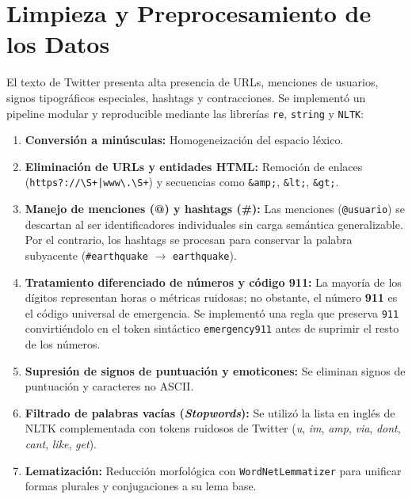 \documentclass[11pt,a4paper]{article}
\begin{document}
\section{Limpieza y Preprocesamiento de los Datos}
El texto de Twitter presenta alta presencia de URLs, menciones de usuarios, signos tipográficos especiales, hashtags y contracciones. Se implementó un pipeline modular y reproducible mediante las librerías \texttt{re}, \texttt{string} y \texttt{NLTK}:

\begin{enumerate}
    \item \textbf{Conversión a minúsculas:} Homogeneización del espacio léxico.
    \item \textbf{Eliminación de URLs y entidades HTML:} Remoción de enlaces (\texttt{https?://\textbackslash S+|www\textbackslash .\textbackslash S+}) y secuencias como \texttt{\&amp;}, \texttt{\&lt;}, \texttt{\&gt;}.
    \item \textbf{Manejo de menciones (@) y hashtags (\#):} Las menciones (\texttt{@usuario}) se descartan al ser identificadores individuales sin carga semántica generalizable. Por el contrario, los hashtags se procesan para conservar la palabra subyacente (\texttt{\#earthquake} $\rightarrow$ \texttt{earthquake}).
    \item \textbf{Tratamiento diferenciado de números y código 911:} La mayoría de los dígitos representan horas o métricas ruidosas; no obstante, el número \textbf{911} es el código universal de emergencia. Se implementó una regla que preserva \texttt{911} convirtiéndolo en el token sintáctico \texttt{emergency911} antes de suprimir el resto de los números.
    \item \textbf{Supresión de signos de puntuación y emoticones:} Se eliminan signos de puntuación y caracteres no ASCII.
    \item \textbf{Filtrado de palabras vacías (\textit{Stopwords}):} Se utilizó la lista en inglés de NLTK complementada con tokens ruidosos de Twitter (\textit{u}, \textit{im}, \textit{amp}, \textit{via}, \textit{dont}, \textit{cant}, \textit{like}, \textit{get}).
    \item \textbf{Lematización:} Reducción morfológica con \texttt{WordNetLemmatizer} para unificar formas plurales y conjugaciones a su lema base.
\end{enumerate}
\end{document}
